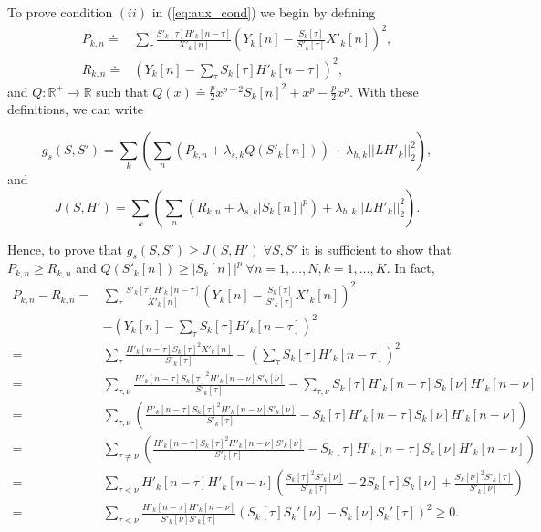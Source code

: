 \documentclass[12pt]{article}
\begin{document}
To prove condition $(ii)$ in (\ref{eq:aux_cond}) we begin by defining
%
\begin{align}\nonumber
P_{k,n} \doteq& \sum_{\tau} \frac{S'_k[\tau]H'_k[n-\tau]}{X'_k[n]}\left( Y_k[n]-\frac{S_k[\tau]}{S'_k[\tau]}X'_k[n] \right)^2, \nonumber\\
R_{k,n} \doteq& ( Y_k[n]-\sum_{\tau}S_k[\tau]H'_k[n-\tau] )^2, \nonumber
\end{align}
 and $Q:\mathbb{R}^+\rightarrow \mathbb{R}$ such that $Q(x) \doteq \frac{p}{2}x^{p-2}S_k[n]^2+x^p -\frac{p}{2}x^{p}$. With these definitions, we can write

\begin{equation} \nonumber
g_s(S,S') = \sum_{k}\left(\sum_{n}(P_{k,n} +\lambda_{s,k}Q(S'_k[n]) )+\lambda_{h,k}||LH'_k||_2^2\right),
\end{equation}
%
and
%
\begin{equation} \nonumber
J(S,H') =  \sum_{k}\left(\sum_{n}(R_{k,n} +\lambda_{s,k}|S_k[n]|^p)+\lambda_{h,k}||LH'_k||_2^2\right).
\end{equation}

Hence, to prove that $g_s(S,S') \geq J(S,H') \;\forall S, S'$ it is sufficient to show that $P_{k,n} \geq R_{k,n}$ and $Q(S'_k[n])\geq |S_k[n]|^p \; \forall n = 1,\ldots, N, k=1,\ldots, K$. In fact,
%
\small
\begin{align}
P_{k,n}-R_{k,n}
=& \sum_{\tau} \frac{S'_k[\tau]H'_k[n-\tau]}{X'_k[n]}\left( Y_k[n]-\frac{S_k[\tau]}{S'_k[\tau]}X'_k[n] \right)^2 \nonumber\\&-( Y_k[n]-\sum_{\tau}S_k[\tau]H'_k[n-\tau] )^2 \nonumber\\
=& \sum_{\tau}\frac{H'_k[n-\tau]S_k[\tau]^2X'_k[n]}{S'_k[\tau]} - \left(\sum_{\tau}S_k[\tau]H'_k[n-\tau]\right)^2\nonumber\\
=& \sum_{\tau,\nu}\frac{H'_k[n-\tau]S_k[\tau]^2H'_k[n-\nu]S'_k[\nu]}{S'_k[\tau]} - \sum_{\tau,\nu}S_k[\tau]H'_k[n-\tau]S_k[\nu]H'_k[n-\nu] \nonumber\\
=&\sum_{\tau,\nu}\left(  \frac{H'_k[n-\tau]S_k[\tau]^2H'_k[n-\nu]S'_k[\nu]}{S'_k[\tau]} - S_k[\tau]H'_k[n-\tau]S_k[\nu]H'_k[n-\nu]\right) \nonumber\\
=& \sum_{\tau\neq \nu}\left(  \frac{H'_k[n-\tau]S_k[\tau]^2H'_k[n-\nu]S'_k[\nu]}{S'_k[\tau]} - S_k[\tau]H'_k[n-\tau]S_k[\nu]H'_k[n-\nu]\right) \nonumber\\
=& \sum_{\tau<\nu}H'_k[n-\tau]H'_k[n-\nu]\left(  \frac{S_k[\tau]^2S'_k[\nu]}{S'_k[\tau]} - 2S_k[\tau]S_k[\nu] +\frac{S_k[\nu]^2S'_k[\tau]}{S'_k[\nu]}\right) \nonumber\\
=& \sum_{\tau<\nu}\frac{H'_k[n-\tau]H'_k[n-\nu]}{S'_k[\nu]S'_k[\tau]}\left(S_k[\tau]S_k'[\nu]-S_k[\nu]S_k'[\tau]\right)^2 \geq 0. \label{eq:A_B} \nonumber
\end{align}
\normalsize
\end{document}

